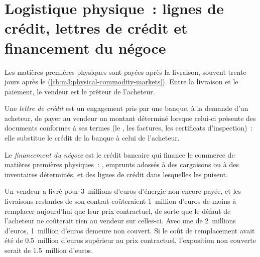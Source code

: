 \section{Logistique physique~: lignes de crédit, lettres de crédit et financement du négoce}

Les matières premières physiques sont payées après la livraison, souvent trente jours après le 
(\cref{ch:m3:physical-commodity-markets}). Entre la livraison et le paiement, le vendeur est le prêteur de l'acheteur.

\begin{definition}\label{def:m3:getting-access-commodities-and-power:lc}
Une \emph{lettre de crédit} est un engagement pris par une banque, à la demande d'un
acheteur, de payer au vendeur un montant déterminé lorsque celui-ci présente des documents conformes à ses termes (le
, les factures, les certificats d'inspection)~: elle substitue le crédit de la banque à celui de l'acheteur.
\end{definition}

\begin{definition}\label{def:m3:getting-access-commodities-and-power:tf}
Le \emph{financement du négoce} est le crédit bancaire qui finance le commerce de matières premières physiques~: , emprunts adossés à des cargaisons ou à des inventaires déterminés, et des lignes de crédit dans lesquelles les 
puisent.
\end{definition}

\begin{example}\label{ex:m3:getting-access-commodities-and-power:lc}
Un vendeur a livré pour 3~millions d'euros d'énergie non encore payée, et les livraisons restantes de son contrat
coûteraient 1~million d'euros de moins à remplacer aujourd'hui que leur prix contractuel, de sorte que le défaut de l'acheteur
ne coûterait rien au vendeur sur celles-ci. Avec une  de 2~millions d'euros, 1~million d'euros demeure non couvert. Si le
coût de remplacement avait été de 0.5~million d'euros supérieur au prix contractuel, l'exposition non couverte serait
de 1.5~million d'euros.
\end{example}

